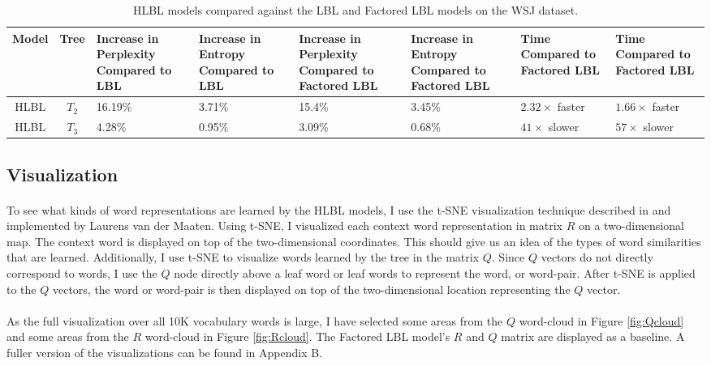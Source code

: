 \begin{table*} \centering
{}
\begin{tabular}{@{}ccC{1.75cm}C{1.75cm}C{1.75cm}C{1.75cm}C{1.75cm}C{1.75cm}@{}}\toprule
Model & Tree
& Increase in Perplexity Compared to LBL & Increase in Entropy Compared to LBL
& Increase in Perplexity Compared to Factored LBL & Increase in Entropy Compared to Factored LBL
& Time Compared to Factored LBL & Time Compared to Factored LBL
\\
\midrule
 HLBL & $T_2$ & 16.19\% & 3.71\% & 15.4\% & 3.45\% & $2.32\times$ faster & $1.66\times$ faster\\
 HLBL & $T_3$ & 4.28\% & 0.95\% & 3.09\% & 0.68\% &$41\times$ slower & $57\times$ slower\\
\bottomrule
\end{tabular}
\caption{HLBL models compared against the LBL and Factored LBL models on the WSJ dataset.}
\label{tab:perplexityAndSpeedup}
\end{table*}


\subsection{Visualization} \label{sec:tsne}
\paragraph{}
To see what kinds of word representations are learned by the HLBL models, I use the t-SNE visualization technique described in \cite{Maaten2008} and implemented by Laurens van der Maaten. Using t-SNE, I visualized each context word representation in matrix $R$ on a two-dimensional map. The context word is displayed on top of the two-dimensional coordinates. This should give us an idea of the types of word similarities that are learned. Additionally, I use t-SNE to visualize words learned by the tree in the matrix $Q$. Since $Q$ vectors do not directly correspond to words, I use the $Q$ node directly above a leaf word or leaf words to represent the word, or word-pair. After t-SNE is applied to the $Q$ vectors, the word or word-pair is then displayed on top of the two-dimensional location representing the $Q$ vector.
\paragraph{}
As the full visualization over all 10K vocabulary words is large, I have selected some areas from the $Q$ word-cloud in Figure \ref{fig:Qcloud} and some areas from the $R$ word-cloud in Figure \ref{fig:Rcloud}. The Factored LBL model's $R$ and $Q$ matrix are displayed as a baseline. A fuller version of the visualizations can be found in Appendix B. 

